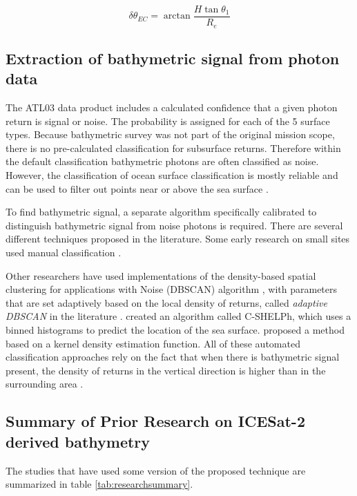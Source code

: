 \begin{equation}
      \delta \theta_{EC} = \arctan{\frac{H \tan{\theta_1}}{R_e}}
\end{equation}


\subsection{Extraction of bathymetric signal from photon data}\label{subsec:signal-finding}
The ATL03 data product includes a calculated confidence that a given photon return is signal or noise. The probability is assigned for each of the 5 surface types. Because bathymetric survey was not part of the original mission scope, there is no pre-calculated classification for subsurface returns. Therefore within the default classification bathymetric photons are often classified as noise. However, the classification of ocean surface classification is mostly reliable and can be used to filter out points near or above the sea surface \parencite{Ranndal2021}.

To find bathymetric signal, a separate algorithm specifically calibrated to distinguish bathymetric signal from noise photons is required. There are several different techniques proposed in the literature. Some early research on small sites used manual classification \parencite{Forfinski-Sarkozi2016,Thomas2021d,Babbel2021a,Albright2021}.

Other researchers have used implementations of the density-based spatial clustering for applications with Noise (DBSCAN) algorithm \parencite{Ester1996}, with parameters that are set adaptively based on the local density of returns, called \emph{adaptive DBSCAN} in the literature \parencite{Ma2020,Xie2021,LeQuilleuc2022b,Liu2021}.  \citeauthor{Thomas2022} created an algorithm called C-SHELPh, which uses a binned histograms to predict the location of the sea surface. \cite{Datta2021} proposed a method based on a kernel density estimation function. All of these automated classification approaches rely on the fact that when there is bathymetric signal present, the density of returns in the vertical direction is higher than in the surrounding area \parencite{Neuenschwander2019}.


\subsection{Summary of Prior Research on ICESat-2 derived bathymetry} %

The studies that have used some version of the proposed technique are summarized in table \ref{tab:researchsummary}.

